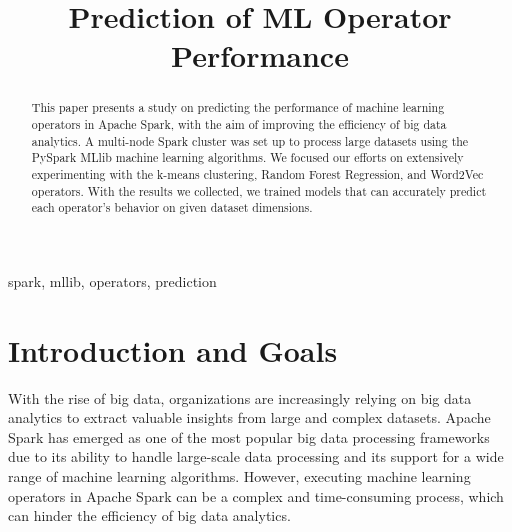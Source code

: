 \documentclass[conference]{IEEEtran}
\begin{document}
\title{Prediction of ML Operator Performance\\
}

\author{
\and
{}
\and
{}
}

\maketitle

\begin{abstract}
This paper presents a study on predicting the performance of machine learning operators in Apache Spark, with the aim of improving the efficiency of big data analytics. A multi-node Spark cluster was set up to process large datasets using the PySpark MLlib machine learning algorithms. We focused our efforts on extensively experimenting with the k-means clustering, Random Forest Regression, and Word2Vec operators. With the results we collected, we trained models that can accurately predict each operator's behavior on given dataset dimensions.
\end{abstract}

\begin{IEEEkeywords}
spark, mllib, operators, prediction
\end{IEEEkeywords}

\section{Introduction and Goals}

With the rise of big data, organizations are increasingly relying on big data analytics to extract valuable insights from large and complex datasets. Apache Spark has emerged as one of the most popular big data processing frameworks due to its ability to handle large-scale data processing and its support for a wide range of machine learning algorithms. However, executing machine learning operators in Apache Spark can be a complex and time-consuming process, which can hinder the efficiency of big data analytics.
\end{document}
